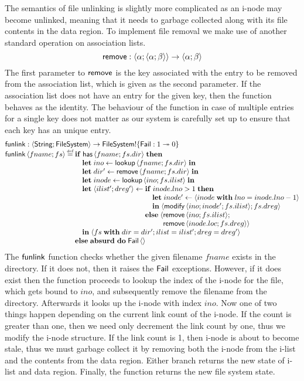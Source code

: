 \documentclass[12pt,phd,lfcs,twoside,openright,logo,leftchapter,normalheadings]{infthesis}
\theoremstyle{plain}
\theoremstyle{definition}
\begin{document}
The semantics of file unlinking is slightly more complicated as an
i-node may become unlinked, meaning that it needs to garbage collected
along with its file contents in the data region. To implement file
removal we make use of another standard operation on association
lists.
%
\[
  \mathsf{remove} : \langle \alpha;\langle \alpha;\beta \rangle \rangle \to \langle \alpha;\beta \rangle
\]
%
The first parameter to $\mathsf{remove}$ is the key associated with the entry
to be removed from the association list, which is given as the second
parameter. If the association list does not have an entry for the
given key, then the function behaves as the identity. The behaviour of
the function in case of multiple entries for a single key does not
matter as our system is carefully set up to ensure that each key has
an unique entry.
%
\[
  \bl
    \funlink : \Record{\String;\FileSystem} \to \FileSystem \eff \{\Fail : \UnitType \opto \ZeroType\}\\
    \funlink\,\Record{fname;fs} \defas
      \bl
        \If\;\dec{has}\,\Record{fname;fs.dir}\;\Then\\
        \quad
          \bl
            \Let\;ino \revto \lookup\,\Record{fname;fs.dir}\;\In\\
            \Let\;dir' \revto \remove\,\Record{fname;fs.dir}\;\In\\
            \Let\;inode \revto \lookup\,\Record{ino;fs.ilist}\;\In\\
            \Let\;\Record{ilist';dreg'} \revto
               \bl
                  \If\;inode.lno > 1\;\Then\\
                   \quad\bl
                      \Let\;inode' \revto \Record{inode\;\With\;lno = inode.lno - 1}\\
                      \In\;\Record{\modify\,\Record{ino;inode';fs.ilist};fs.dreg}
                    \el\\
                  \Else\;
                       \Record{\bl\remove\,\Record{ino;fs.ilist};\\
                       \remove\,\Record{inode.loc;fs.dreg}}
                    \el
                  \el\\
            \In\;\Record{fs\;\With\;dir = dir'; ilist = ilist'; dreg = dreg'}
          \el\\
        \Else\; \Absurd~\Do\;\Fail\,\Unit
      \el
  \el
\]
%
The $\mathsf{funlink}$ function checks whether the given filename $fname$
exists in the directory. If it does not, then it raises the $\mathsf{Fail}$
exceptions. However, if it does exist then the function proceeds to
lookup the index of the i-node for the file, which gets bound to
$ino$, and subsequently remove the filename from the
directory. Afterwards it looks up the i-node with index $ino$. Now one
of two things happen depending on the current link count of the
i-node. If the count is greater than one, then we need only decrement
the link count by one, thus we modify the i-node structure. If the
link count is 1, then i-node is about to become stale, thus we must
garbage collect it by removing both the i-node from the i-list and the
contents from the data region. Either branch returns the new state of
i-list and data region. Finally, the function returns the new file
system state.
\end{document}
